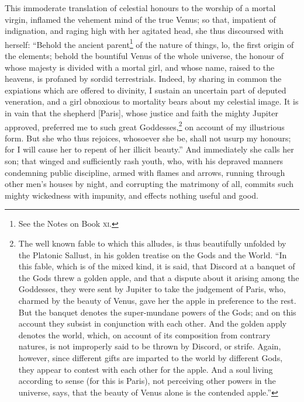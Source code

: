 \documentclass[12pt]{article}
\begin{document}
This immoderate translation of celestial honours to the worship of a mortal
virgin, inflamed the vehement mind of the true Venus; so that, impatient of
indignation, and raging high with her agitated head, she thus discoursed with
herself: ``Behold the ancient parent\footnote{See the Notes on Book
\textsc{xi}.} of the nature of things, lo, the first origin of the elements;
behold the bountiful Venus of the whole universe, the honour of whose majesty
is divided with a mortal girl, and whose name, raised to the heavens, is
profaned by sordid terrestrials. Indeed, by sharing in common the expiations
which are offered to divinity, I sustain an uncertain part of deputed
veneration, and a girl obnoxious to mortality bears about my celestial image.
It is in vain that the shepherd [Paris], whose justice and faith the mighty
Jupiter approved, preferred me to such great Goddesses,\footnote{The well known
fable to which this alludes, is thus beautifully unfolded by the Platonic
Sallust, in his golden treatise on the Gods and the World. ``In this fable,
which is of the mixed kind, it is said, that Discord at a banquet of the Gods
threw a golden apple, and that a dispute about it arising among the Goddesses,
they were sent by Jupiter to take the judgement of Paris, who, charmed by the
beauty of Venus, gave her the apple in preference to the rest. But the banquet
denotes the super-mundane powers of the Gods; and on this account they subsist
in conjunction with each other. And the golden apply denotes the world, which,
on account of its composition from contrary natures, is not improperly said to
be thrown by Discord, or strife. Again, however, since different gifts are
imparted to the world by different Gods, they appear to contest with each other
for the apple. And a soul living according to sense (for this is Paris), not
perceiving other powers in the universe, says, that the beauty of Venus alone
is the contended apple.''} on account of my illustrious form. But she who thus
rejoices, whosoever she be, shall not usurp my honours; for I will cause her to
repent of her illicit beauty.'' And immediately she calls her son; that winged
and sufficiently rash youth, who, with his depraved manners condemning public
discipline, armed with flames and arrows, running through other men's houses by
night, and corrupting the matrimony of all, commits such mighty wickedness with
impunity, and effects nothing useful and good.
\end{document}
